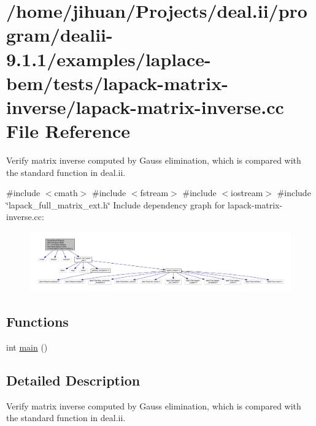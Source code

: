 \hypertarget{lapack-matrix-inverse_8cc}{}\section{/home/jihuan/\+Projects/deal.ii/program/dealii-\/9.1.1/examples/laplace-\/bem/tests/lapack-\/matrix-\/inverse/lapack-\/matrix-\/inverse.cc File Reference}
\label{lapack-matrix-inverse_8cc}


Verify matrix inverse computed by Gauss elimination, which is compared with the standard function in deal.\+ii.  


{\ttfamily \#include $<$cmath$>$}\newline
{\ttfamily \#include $<$fstream$>$}\newline
{\ttfamily \#include $<$iostream$>$}\newline
{\ttfamily \#include \char`\"{}lapack\+\_\+full\+\_\+matrix\+\_\+ext.\+h\char`\"{}}\newline
Include dependency graph for lapack-\/matrix-\/inverse.cc\+:\nopagebreak
\begin{figure}[H]
\begin{center}
\leavevmode
\includegraphics[width=350pt]{lapack-matrix-inverse_8cc__incl}
\end{center}
\end{figure}
\subsection*{Functions}
\begin{DoxyCompactItemize}
\item 
int \hyperlink{lapack-matrix-inverse_8cc_ae66f6b31b5ad750f1fe042a706a4e3d4}{main} ()
\end{DoxyCompactItemize}


\subsection{Detailed Description}
Verify matrix inverse computed by Gauss elimination, which is compared with the standard function in deal.\+ii. 

